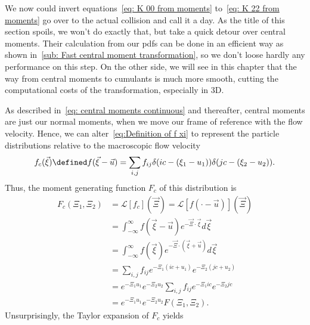 We now could invert equations~\eqref{eq: K 00 from moments} to~\eqref{eq: K 22 from moments} go over to the actual collision and call it a day.
As the title of this section spoils, we won't do exactly that, but take a quick detour over central moments.
Their calculation from our \glspl{pdf} can be done in an efficient way as shown in~\ref{sub: Fast central moment transformation},
so we don't loose hardly any performance on this step.
On the other side, we will see in this chapter that the way from central moments to cumulants is much more smooth, cutting the computational costs of the transformation, especially in 3D.

As described in~\eqref{eq: central moments continuous} and thereafter, central moments are just our normal moments, when we move our frame of reference with the flow velocity.
Hence, we can alter~\eqref{eq:Definition of f xi} to represent the particle distributions relative to the macroscopic flow velocity
\begin{equation}
  \label{eq:Definition of f c xi}
  f_c(\vec{\xi}) \defined f(\vec{\xi}-\vec{u}) = \sum_{i,j} f_{ij}\delta(ic - (\xi_1-u_1))\delta(jc - (\xi_2-u_2)).
\end{equation}
Thus, the moment generating function $F_c$ of this distribution is
\begin{equation}
  \label{eq: Definition of centralized F}
  \begin{aligned}
    F_c(\Xi_1, \Xi_2) & = \mathcal{L}[f_c](\vec{\Xi}) = \mathcal{L}[f(\cdot - \vec{u})](\vec{\Xi}) \\
    & = \int_{-\infty}^\infty f(\vec{\xi}-\vec{u}) e^{-\vec{\Xi} \cdot \vec{\xi}}d\vec{\xi} \\
    & = \int_{-\infty}^\infty f(\vec{\xi}) e^{-\vec{\Xi} \cdot (\vec{\xi} + \vec{u})}d\vec{\xi} \\
    & = \sum_{i,j}f_{ij} e^{-\Xi_1 (ic+u_1)} e^{-\Xi_2 (jc+u_2)} \\
    & = e^{-\Xi_1 u_1}e^{-\Xi_2 u_2}\sum_{i,j}f_{ij} e^{-\Xi_1 ic} e^{-\Xi_2 jc}\\
    & = e^{-\Xi_1 u_1}e^{-\Xi_2 u_2} F(\Xi_1, \Xi_2).
  \end{aligned}
\end{equation}
Unsurprisingly, the Taylor expansion of $F_c$ yields
